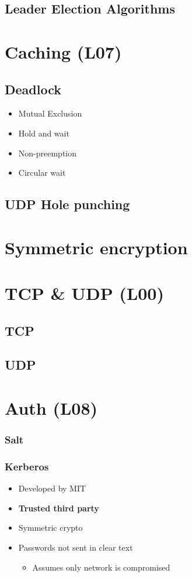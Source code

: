 \documentclass{easyclass}
\begin{document}
\section{Leader Election Algorithms}

\chapter{Caching (L07)}
\section{Deadlock}
\begin{theo}{}
    \begin{itemize}
        \item Mutual Exclusion
        \item Hold and wait
        \item Non-preemption
        \item Circular wait
    \end{itemize}
\end{theo}
\section{UDP Hole punching}
\chapter{Symmetric encryption}

\chapter{TCP \& UDP (L00)}
\section{TCP}
\section{UDP}

\chapter{Auth (L08)}
\subsection{Salt}
\subsection{Kerberos}
\begin{itemize}
    \item Developed by MIT
    \item \textbf{Trusted third party}
    \item Symmetric crypto
    \item Passwords not sent in clear text
    \begin{itemize}
        \item Assumes only network is compromised
    \end{itemize}
\end{itemize}
\end{document}
